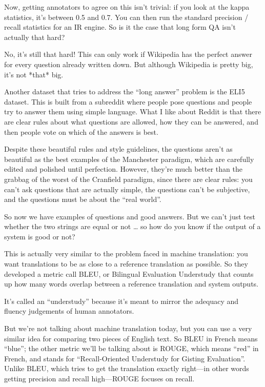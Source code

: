 Now, getting annotators to agree on this isn’t trivial: if you look at the kappa statistics, it’s between 0.5 and 0.7.  You can then run the standard precision / recall statistics for an IR engine.  So is it the case that long form QA isn’t actually that hard?

No, it’s still that hard!  This can only work if Wikipedia has the perfect answer for every question already written down.  But although Wikipedia is pretty big, it’s not *that* big.  

Another dataset that tries to address the “long answer” problem is the ELI5 dataset.  This is built from a subreddit where people pose questions and people try to answer them using simple language.  What I like about Reddit is that there are clear rules about what questions are allowed, how they can be answered, and then people vote on which of the answers is best.

Despite these beautiful rules and style guidelines, the questions aren’t as beautiful as the best examples of the Manchester paradigm, which are carefully edited and polished until perfection.  However, they’re much better than the grabbag of the worst of the Cranfield paradigm, since there are clear rules: you can’t ask questions that are actually simple, the questions can’t be subjective, and the questions must be about the “real world”.

So now we have examples of questions and good answers.  But we can’t just test whether the two strings are equal or not … so how do you know if the output of a system is good or not?

This is actually very similar to the problem faced in machine translation: you want translations to be as close to a reference translation as possible.  So they developed a metric call BLEU, or Bilingual Evaluation Understudy that counts up how many words overlap between a reference translation and system outputs.

It’s called an “understudy” because it’s meant to mirror the adequacy and fluency judgements of human annotators.  

But we’re not talking about machine translation today, but you can use a very similar idea for comparing two pieces of English text.  So BLEU in French means “blue”; the other metric we’ll be talking about is ROUGE, which means “red” in French, and stands for “Recall-Oriented Understudy for Gisting Evaluation”.  Unlike BLEU, which tries to get the translation exactly right—in other words getting precision and recall high—ROUGE focuses on recall.  


